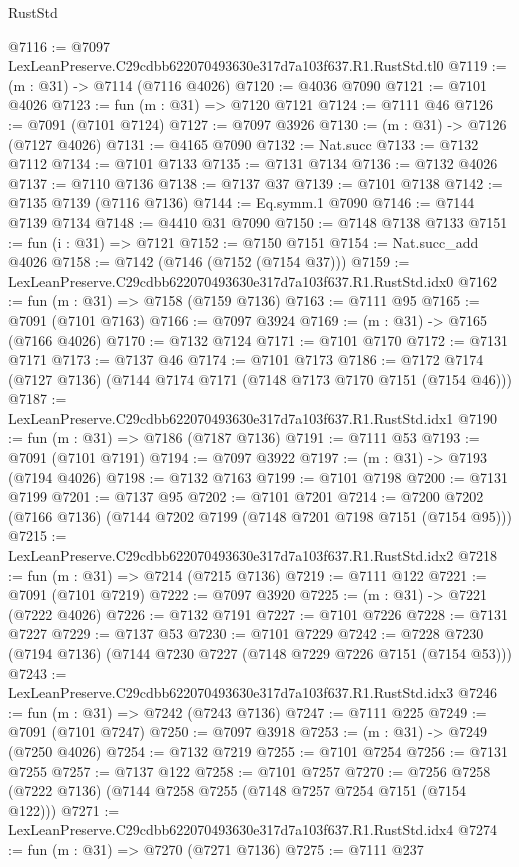 \begin{lexlean}{RustStd}
\begin{coremodule}
@7116 := @7097 LexLeanPreserve.C29cdbb622070493630e317d7a103f637.R1.RustStd.tl0
@7119 := (m : @31) -> @7114 (@7116 @4026)
@7120 := @4036 @7090
@7121 := @7101 @4026
@7123 := fun (m : @31) => @7120 @7121
@7124 := @7111 @46
@7126 := @7091 (@7101 @7124)
@7127 := @7097 @3926
@7130 := (m : @31) -> @7126 (@7127 @4026)
@7131 := @4165 @7090
@7132 := Nat.succ
@7133 := @7132 @7112
@7134 := @7101 @7133
@7135 := @7131 @7134
@7136 := @7132 @4026
@7137 := @7110 @7136
@7138 := @7137 @37
@7139 := @7101 @7138
@7142 := @7135 @7139 (@7116 @7136)
@7144 := Eq.symm.{1} @7090
@7146 := @7144 @7139 @7134
@7148 := @4410 @31 @7090
@7150 := @7148 @7138 @7133
@7151 := fun (i : @31) => @7121
@7152 := @7150 @7151
@7154 := Nat.succ_add @4026
@7158 := @7142 (@7146 (@7152 (@7154 @37)))
@7159 := LexLeanPreserve.C29cdbb622070493630e317d7a103f637.R1.RustStd.idx0
@7162 := fun (m : @31) => @7158 (@7159 @7136)
@7163 := @7111 @95
@7165 := @7091 (@7101 @7163)
@7166 := @7097 @3924
@7169 := (m : @31) -> @7165 (@7166 @4026)
@7170 := @7132 @7124
@7171 := @7101 @7170
@7172 := @7131 @7171
@7173 := @7137 @46
@7174 := @7101 @7173
@7186 := @7172 @7174 (@7127 @7136) (@7144 @7174 @7171 (@7148 @7173 @7170 @7151 (@7154 @46)))
@7187 := LexLeanPreserve.C29cdbb622070493630e317d7a103f637.R1.RustStd.idx1
@7190 := fun (m : @31) => @7186 (@7187 @7136)
@7191 := @7111 @53
@7193 := @7091 (@7101 @7191)
@7194 := @7097 @3922
@7197 := (m : @31) -> @7193 (@7194 @4026)
@7198 := @7132 @7163
@7199 := @7101 @7198
@7200 := @7131 @7199
@7201 := @7137 @95
@7202 := @7101 @7201
@7214 := @7200 @7202 (@7166 @7136) (@7144 @7202 @7199 (@7148 @7201 @7198 @7151 (@7154 @95)))
@7215 := LexLeanPreserve.C29cdbb622070493630e317d7a103f637.R1.RustStd.idx2
@7218 := fun (m : @31) => @7214 (@7215 @7136)
@7219 := @7111 @122
@7221 := @7091 (@7101 @7219)
@7222 := @7097 @3920
@7225 := (m : @31) -> @7221 (@7222 @4026)
@7226 := @7132 @7191
@7227 := @7101 @7226
@7228 := @7131 @7227
@7229 := @7137 @53
@7230 := @7101 @7229
@7242 := @7228 @7230 (@7194 @7136) (@7144 @7230 @7227 (@7148 @7229 @7226 @7151 (@7154 @53)))
@7243 := LexLeanPreserve.C29cdbb622070493630e317d7a103f637.R1.RustStd.idx3
@7246 := fun (m : @31) => @7242 (@7243 @7136)
@7247 := @7111 @225
@7249 := @7091 (@7101 @7247)
@7250 := @7097 @3918
@7253 := (m : @31) -> @7249 (@7250 @4026)
@7254 := @7132 @7219
@7255 := @7101 @7254
@7256 := @7131 @7255
@7257 := @7137 @122
@7258 := @7101 @7257
@7270 := @7256 @7258 (@7222 @7136) (@7144 @7258 @7255 (@7148 @7257 @7254 @7151 (@7154 @122)))
@7271 := LexLeanPreserve.C29cdbb622070493630e317d7a103f637.R1.RustStd.idx4
@7274 := fun (m : @31) => @7270 (@7271 @7136)
@7275 := @7111 @237

\end{coremodule}
\end{lexlean}
